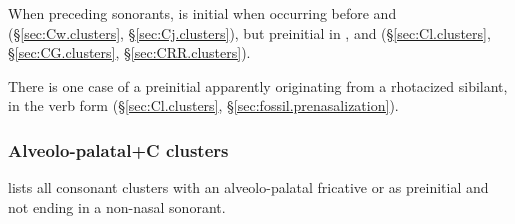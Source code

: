 When preceding sonorants,  is initial when occurring before  and  (§\ref{sec:Cw.clusters}, §\ref{sec:Cj.clusters}), but preinitial in ,  and  (§\ref{sec:Cl.clusters}, §\ref{sec:CG.clusters}, §\ref{sec:CRR.clusters}).

There is one case of a preinitial   apparently originating from a rhotacized sibilant, in the verb form  (§\ref{sec:Cl.clusters}, §\ref{sec:fossil.prenasalization}).

\subsubsection{Alveolo-palatal+C clusters}  \label{sec:shC.clusters}
 lists all consonant clusters with an alveolo-palatal fricative  or  as preinitial and not ending in a non-nasal sonorant.  

